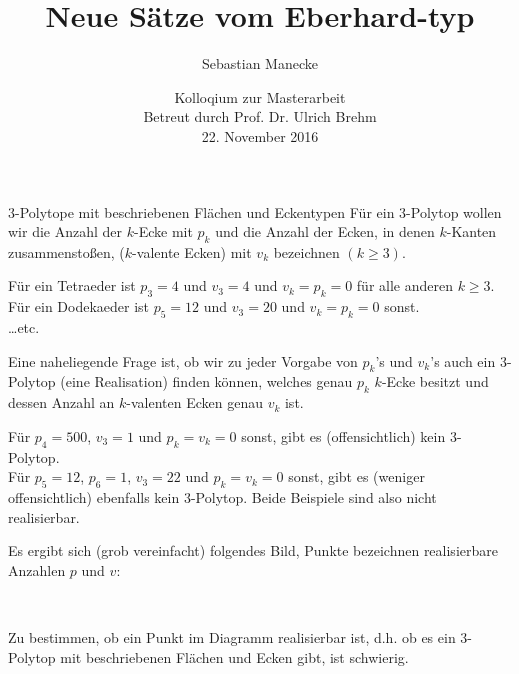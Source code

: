 \documentclass[10pt, notheorems]{beamer}
\begin{document}
\title{Neue Sätze vom {\sc Eberhard}-typ}
\author{Sebastian Manecke}
\date{Kolloqium zur Masterarbeit\\Betreut durch Prof. Dr. Ulrich Brehm\\22. November 2016}
\frame{\titlepage}
\begin{frame}{$3$-Polytope mit beschriebenen Flächen und Eckentypen}
  Für ein $3$-Polytop wollen wir die Anzahl der $k$-Ecke mit $p_k$ und die Anzahl der Ecken, in denen $k$-Kanten zusammenstoßen, ($k$-valente Ecken) mit $v_k$ bezeichnen $(k \geq 3)$.
  \pause
  \begin{example}
    Für ein Tetraeder ist $p_3 = 4$ und $v_3 = 4$ und $v_k = p_k = 0$ für alle anderen $k \geq 3$.\\
    \pause
    Für ein Dodekaeder ist $p_5 = 12$ und $v_3 = 20$ und $v_k = p_k = 0$ sonst.\\
    \pause
    \dots etc. 
  \end{example}
  Eine naheliegende Frage ist, ob wir zu jeder Vorgabe von $p_k$'s und $v_k$'s auch ein $3$-Polytop (eine Realisation) finden können, welches genau $p_k$ $k$-Ecke besitzt und dessen Anzahl an $k$-valenten Ecken genau $v_k$ ist.
  \pause
  \begin{example}
    Für $p_4 = 500$, $v_3 = 1$ und $p_k = v_k = 0$ sonst, gibt es (offensichtlich) kein $3$-Polytop.\\
    \pause
    Für $p_5 = 12$, $p_6 = 1$, $v_3 = 22$ und $p_k = v_k = 0$ sonst, gibt es (weniger offensichtlich) ebenfalls kein $3$-Polytop. Beide Beispiele sind also nicht realisierbar.
  \end{example}
\end{frame}

\begin{frame}
  Es ergibt sich (grob vereinfacht) folgendes Bild, Punkte bezeichnen realisierbare Anzahlen $p$ und $v$:

  \vspace{0.5cm}
  { \centering
    \\
  }
  \vspace{0.5cm}
  \pause
  Zu bestimmen, ob ein Punkt im Diagramm realisierbar ist, d.h. ob es ein $3$-Polytop mit beschriebenen Flächen und Ecken gibt, ist schwierig.
\end{frame}
\end{document}
